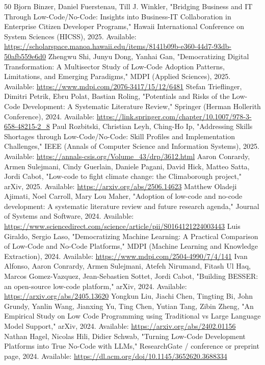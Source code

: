 \documentclass[conference]{IEEEtran}
\begin{document}
\begin{thebibliography}{50}
 Bjorn Binzer, Daniel Fuerstenau, Till J. Winkler, "Bridging Business and IT Through Low-Code/No-Code: Insights into Business-IT Collaboration in Enterprise Citizen Developer Programs," Hawaii International Conference on System Sciences (HICSS), 2025. Available: \url{https://scholarspace.manoa.hawaii.edu/items/8141b09b-e360-44d7-93db-50afb559e6d0}
 Zhengwu Shi, Junyu Dong, Yanhai Gan, "Democratizing Digital Transformation: A Multisector Study of Low-Code Adoption Patterns, Limitations, and Emerging Paradigms," MDPI (Applied Sciences), 2025. Available: \url{https://www.mdpi.com/2076-3417/15/12/6481}
 Stefan Trieflinger, Dimitri Petrik, Ebru Polat, Bastian Roling, "Potentials and Risks of the Low-Code Development: A Systematic Literature Review," Springer (Herman Hollerith Conference), 2024. Available: \url{https://link.springer.com/chapter/10.1007/978-3-658-48215-2_8}
 Paul Rozbitski, Christian Leyh, Ching-Ho Ip, "Addressing Skills Shortages through Low-Code/No-Code: Skill Profiles and Implementation Challenges," IEEE (Annals of Computer Science and Information Systems), 2025. Available: \url{https://annals-csis.org/Volume_43/drp/3612.html}
 Aaron Conrardy, Armen Sulejmani, Cindy Guerlain, Daniele Pagani, David Hick, Matteo Satta, Jordi Cabot, "Low-code to fight climate change: the Climaborough project," arXiv, 2025. Available: \url{https://arxiv.org/abs/2506.14623}
 Matthew Oladeji Ajimati, Noel Carroll, Mary Lou Maher, "Adoption of low-code and no-code development: A systematic literature review and future research agenda," Journal of Systems and Software, 2024. Available: \url{https://www.sciencedirect.com/science/article/pii/S0164121224003443}
 Luis Giraldo, Sergio Laso, "Democratizing Machine Learning: A Practical Comparison of Low-Code and No-Code Platforms," MDPI (Machine Learning and Knowledge Extraction), 2024. Available: \url{https://www.mdpi.com/2504-4990/7/4/141}
 Ivan Alfonso, Aaron Conrardy, Armen Sulejmani, Atefeh Nirumand, Fitash Ul Haq, Marcos Gomez-Vazquez, Jean-Sebastien Sottet, Jordi Cabot, "Building BESSER: an open-source low-code platform," arXiv, 2024. Available: \url{https://arxiv.org/abs/2405.13620}
 Yongkun Liu, Jiachi Chen, Tingting Bi, John Grundy, Yanlin Wang, Jianxing Yu, Ting Chen, Yutian Tang, Zibin Zheng, "An Empirical Study on Low Code Programming using Traditional vs Large Language Model Support," arXiv, 2024. Available: \url{https://arxiv.org/abs/2402.01156}
 Nathan Hagel, Nicolas Hili, Didier Schwab, "Turning Low-Code Development Platforms into True No-Code with LLMs," ResearchGate / conference or preprint page, 2024. Available: \url{https://dl.acm.org/doi/10.1145/3652620.3688334}

\end{thebibliography}
\end{document}
